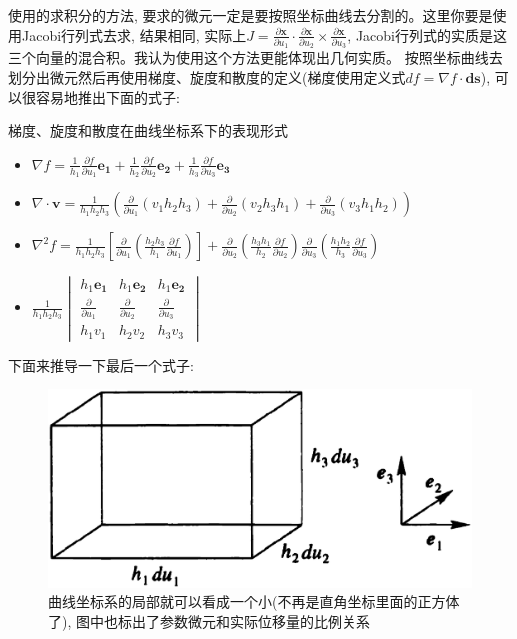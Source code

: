 使用的求积分的方法, 要求的微元一定是要按照坐标曲线去分割的。这里你要是使用Jacobi行列式去求, 结果相同, 实际上$J=\frac{\partial \bm{x}}{\partial u_1}\cdot
\frac{\partial \bm{x}}{\partial u_2}\times\frac{\partial \bm{x}}{\partial u_3}$, Jacobi行列式的实质是这三个向量的混合积。我认为使用这个方法更能体现出几何实质。
按照坐标曲线去划分出微元然后再使用梯度、旋度和散度的定义(梯度使用定义式$df=\nabla f \cdot \bm{ds}$), 可以很容易地推出下面的式子:
\begin{theorem}{梯度、旋度和散度在曲线坐标系下的表现形式}
    \begin{itemize}
        \item $\nabla f = \frac{1}{h_1}\frac{\partial f}{\partial u_1}\bm{e_1}+\frac{1}{h_2}\frac{\partial f}{\partial u_2}\bm{e_2}+\frac{1}{h_3}\frac{\partial f}{\partial u_3}\bm{e_3}$
        \item $\nabla \cdot \bm{v} = \frac{1}{h_1h_2h_3}\left(\frac{\partial}{\partial u_1}(v_1h_2h_3)+\frac{\partial}{\partial u_2}(v_2h_3h_1)+\frac{\partial}{\partial u_3}(v_3h_1h_2)\right)$
        \item $\nabla^2 f = \frac{1}{h_1h_2h_3}\left[\frac{\partial}{\partial u_1}\left(\frac{h_2h_3}{h_1}\frac{\partial f}{\partial u_1}\right)\right]
               +\frac{\partial}{\partial u_2}\left(\frac{h_3h_1}{h_2}\frac{\partial f}{\partial u_2}\right)
               \frac{\partial}{\partial u_3}\left(\frac{h_1h_2}{h_3}\frac{\partial f}{\partial u_3}\right)$
        \item 
        \begin{math}
            \displaystyle
            \frac{1}{h_1h_2h_3} 
            \begin{vmatrix}
            h_1\bm{e_1}&  h_1\bm{e_2} & h_1\bm{e_2} \\
            \frac{\partial }{\partial u_1} & \frac{\partial }{\partial u_2} & \frac{\partial }{\partial u_3}\\
            h_1v_1 & h_2v_2 & h_3v_3
            \end{vmatrix}
        \end{math}
    \end{itemize}
\end{theorem}
\begin{thinknote}
    下面来推导一下最后一个式子:
\end{thinknote}
\begin{figure}[htbp]
    \centering
    \includegraphics[scale=0.26]{fig/a-2.eps}
    \caption{曲线坐标系的局部就可以看成一个小(不再是直角坐标里面的正方体了), 图中也标出了参数微元和实际位移量的比例关系}
\end{figure}
